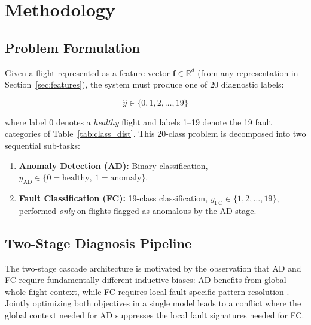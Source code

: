 \section{Methodology}
\label{sec:methodology}

\subsection{Problem Formulation}
\label{subsec:formulation}

Given a flight represented as a feature vector
$\mathbf{f} \in \mathbb{R}^d$ (from any representation in
Section~\ref{sec:features}), the system must produce one of 20 diagnostic labels:

\begin{equation}
    \hat{y} \in \{0, 1, 2, \ldots, 19\}
\end{equation}

where label 0 denotes a \textit{healthy} flight and labels 1--19 denote the
19 fault categories of Table~\ref{tab:class_dist}. This 20-class problem is
decomposed into two sequential sub-tasks:

\begin{enumerate}
    \item \textbf{Anomaly Detection (AD):} Binary classification,
          $y_{\text{AD}} \in \{0 = \text{healthy},\ 1 = \text{anomaly}\}$.
    \item \textbf{Fault Classification (FC):} 19-class classification,
          $y_{\text{FC}} \in \{1, 2, \ldots, 19\}$, performed \textit{only} on
          flights flagged as anomalous by the AD stage.
\end{enumerate}

\subsection{Two-Stage Diagnosis Pipeline}
\label{subsec:pipeline}

The two-stage cascade architecture is motivated by the observation that AD and
FC require fundamentally different inductive biases: AD benefits from global
whole-flight context, while FC requires local fault-specific pattern resolution
\cite{lmsd2025}. Jointly optimizing both objectives in a single model leads to
a conflict where the global context needed for AD suppresses the local fault
signatures needed for FC.

